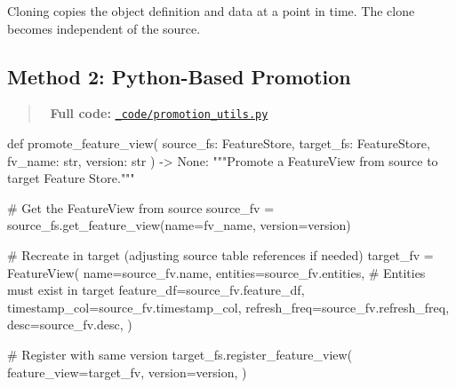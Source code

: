\documentclass[
  letterpaper,
  DIV=11,
  numbers=noendperiod]{scrreprt}
\newenvironment{Shaded}{\begin{snugshade}}{\end{snugshade}}
\newcommand{\BuiltInTok}[1]{\textcolor[rgb]{0.00,0.23,0.31}{#1}}
\newcommand{\CommentTok}[1]{\textcolor[rgb]{0.37,0.37,0.37}{#1}}
\newcommand{\KeywordTok}[1]{\textcolor[rgb]{0.00,0.23,0.31}{#1}}
\newcommand{\NormalTok}[1]{\textcolor[rgb]{0.00,0.23,0.31}{#1}}
\newcommand{\OperatorTok}[1]{\textcolor[rgb]{0.37,0.37,0.37}{#1}}
\newcommand{\VariableTok}[1]{\textcolor[rgb]{0.07,0.07,0.07}{#1}}
\begin{document}
\begin{tcolorbox}[enhanced jigsaw, title=\textcolor{quarto-callout-note-color}{\faInfo}\hspace{0.5em}{Note}, colbacktitle=quarto-callout-note-color!10!white, rightrule=.15mm, arc=.35mm, colframe=quarto-callout-note-color-frame, left=2mm, bottomtitle=1mm, toptitle=1mm, breakable, bottomrule=.15mm, opacityback=0, titlerule=0mm, toprule=.15mm, opacitybacktitle=0.6, colback=white, coltitle=black, leftrule=.75mm]

Cloning copies the object definition and data at a point in time. The
clone becomes independent of the source.

\end{tcolorbox}

\hypertarget{method-2-python-based-promotion}{%
\subsection{Method 2: Python-Based
Promotion}\label{method-2-python-based-promotion}}

\begin{quote}
📁 \textbf{Full code:}
\href{_code/promotion_utils.py}{\texttt{\_code/promotion\_utils.py}}
\end{quote}

\begin{Shaded}
\begin{Highlighting}[]
\KeywordTok{def}\NormalTok{ promote\_feature\_view(}
\NormalTok{    source\_fs: FeatureStore,}
\NormalTok{    target\_fs: FeatureStore,}
\NormalTok{    fv\_name: }\BuiltInTok{str}\NormalTok{,}
\NormalTok{    version: }\BuiltInTok{str}
\NormalTok{) }\OperatorTok{{-}\textgreater{}} \VariableTok{None}\NormalTok{:}
    \CommentTok{"""Promote a FeatureView from source to target Feature Store."""}
    
    \CommentTok{\# Get the FeatureView from source}
\NormalTok{    source\_fv }\OperatorTok{=}\NormalTok{ source\_fs.get\_feature\_view(name}\OperatorTok{=}\NormalTok{fv\_name, version}\OperatorTok{=}\NormalTok{version)}
    
    \CommentTok{\# Recreate in target (adjusting source table references if needed)}
\NormalTok{    target\_fv }\OperatorTok{=}\NormalTok{ FeatureView(}
\NormalTok{        name}\OperatorTok{=}\NormalTok{source\_fv.name,}
\NormalTok{        entities}\OperatorTok{=}\NormalTok{source\_fv.entities,  }\CommentTok{\# Entities must exist in target}
\NormalTok{        feature\_df}\OperatorTok{=}\NormalTok{source\_fv.feature\_df,}
\NormalTok{        timestamp\_col}\OperatorTok{=}\NormalTok{source\_fv.timestamp\_col,}
\NormalTok{        refresh\_freq}\OperatorTok{=}\NormalTok{source\_fv.refresh\_freq,}
\NormalTok{        desc}\OperatorTok{=}\NormalTok{source\_fv.desc,}
\NormalTok{    )}
    
    \CommentTok{\# Register with same version}
\NormalTok{    target\_fs.register\_feature\_view(}
\NormalTok{        feature\_view}\OperatorTok{=}\NormalTok{target\_fv,}
\NormalTok{        version}\OperatorTok{=}\NormalTok{version,}
\NormalTok{    )}
\end{Highlighting}
\end{Shaded}
\end{document}
